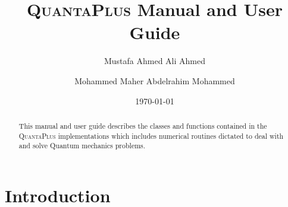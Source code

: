 \documentclass[a4paper,12pt]{article}
\begin{document}
\begin{titlepage}
\title{\textsc{QuantaPlus} Manual and User Guide}
\author{Mustafa Ahmed Ali Ahmed}
\affil{\textcolor{red}{Mustafa's affilation must be added here}}
\author{Mohammed Maher Abdelrahim Mohammed}

 
 
\date{\today}%

% 
\maketitle
 
\begin{abstract}
	This manual and user guide describes the classes and functions contained
	in the \textsc{QuantaPlus} implementations which includes numerical routines dictated to deal with and solve Quantum mechanics problems.
\end{abstract}
\end{titlepage}
 \tableofcontents
 
 \section{Introduction}\label{introduction}
  
\end{document}
